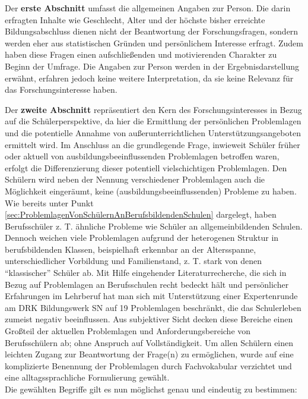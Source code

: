 Der \textbf{erste Abschnitt} umfasst die allgemeinen Angaben zur Person. Die darin erfragten Inhalte wie Geschlecht, Alter und der höchste bisher erreichte Bildungsabschluss dienen nicht der Beantwortung der Forschungsfragen, sondern werden eher aus statistischen Gründen und persönlichem Interesse erfragt. Zudem haben diese Fragen einen aufschließenden und motivierenden Charakter zu Beginn der Umfrage. Die Angaben zur Person werden in der Ergebnisdarstellung erwähnt, erfahren jedoch keine weitere Interpretation, da sie keine Relevanz für das Forschungsinteresse haben.

Der \textbf{zweite Abschnitt} repräsentiert den Kern des Forschungsinteresses in Bezug auf die Schülerperspektive, da hier die Ermittlung der persönlichen Problemlagen und die potentielle Annahme von außerunterrichtlichen Unterstützungsangeboten ermittelt wird. Im Anschluss an die grundlegende Frage, inwieweit Schüler früher oder aktuell von ausbildungsbeeinflussenden Problemlagen betroffen waren, erfolgt die Differenzierung dieser potentiell vielschichtigen Problemlagen. Den Schülern wird neben der Nennung verschiedener Problemlagen auch die Möglichkeit eingeräumt, keine (ausbildungsbeeinflussenden) Probleme zu haben. Wie bereits unter Punkt \ref{sec:ProblemlagenVonSchülernAnBerufsbildendenSchulen} dargelegt, haben Berufsschüler z. T. ähnliche Probleme wie Schüler an allgemeinbildenden Schulen. Dennoch weichen viele Problemlagen aufgrund der heterogenen Struktur in berufsbildenden Klassen, beispielhaft erkennbar an der Altersspanne, unterschiedlicher Vorbildung und Familienstand, z. T. stark von denen "`klassischer"' Schüler ab. Mit Hilfe eingehender Literaturrecherche, die sich in Bezug auf Problemlagen an Berufsschulen recht bedeckt hält und persönlicher Erfahrungen im Lehrberuf hat man sich mit Unterstützung einer Expertenrunde am DRK Bildungswerk SN auf 19 Problemlagen beschränkt, die das Schulerleben zumeist negativ beeinflussen. Aus subjektiver Sicht decken diese Bereiche einen Großteil der aktuellen Problemlagen und Anforderungsbereiche von Berufsschülern ab; ohne Anspruch auf  Vollständigkeit. Um allen Schülern einen leichten Zugang zur Beantwortung der Frage(n) zu ermöglichen, wurde auf eine komplizierte Benennung der Problemlagen durch Fachvokabular verzichtet und eine alltagssprachliche Formulierung gewählt.\\

\noindent
Die gewählten Begriffe gilt es nun möglichst genau und eindeutig zu bestimmen:\\

